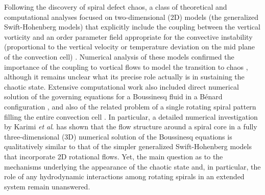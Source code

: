 \documentclass[preprint,prx,floatfix]{revtex4-1}
\begin{document}
Following the discovery of spiral defect chaos, a class of theoretical and computational analyses focused on two-dimensional (2D) models (the generalized Swift-Hohenberg models) that explicitly include the coupling between the vertical vorticity and an order parameter field appropriate for the convective instability (proportional to the vertical velocity or temperature deviation on the mid plane of the convection cell) \cite{swift1977hydrodynamic,manneville1983two,re:greenside85}. Numerical analysis of these models confirmed the importance of the coupling to vortical flows to model the transition to chaos \cite{xi1993spiral,re:schmitz02,cross1996theoretical,re:huang07,karimi2011exploring,karimi2019erratum}, although it remains unclear what its precise role actually is in sustaining the chaotic state. Extensive computational work also included direct numerical solution of the governing equations for a Boussinesq fluid in a B\'enard configuration \cite{re:decker94,re:schmitz02,chiam:2003,karimi2011exploring,*karimi2019erratum}, and also of the related problem of a single rotating spiral pattern filling the entire convection cell \cite{re:bestehorn92,re:bestehorn93,re:xi93,xi1993spiral}. In particular, a detailed numerical investigation by Karimi \textit{et al}. \cite{karimi2011exploring,*karimi2019erratum} has shown that the flow structure around a spiral core in a fully three-dimensional (3D) numerical solution of the Boussinesq equations is qualitatively similar to that of the simpler generalized Swift-Hohenberg models that incorporate 2D rotational flows. Yet, the main question as to the mechanisms underlying the appearance of the chaotic state and, in particular, the role of any hydrodynamic interactions among rotating spirals in an extended system remain unanswered.
\end{document}
